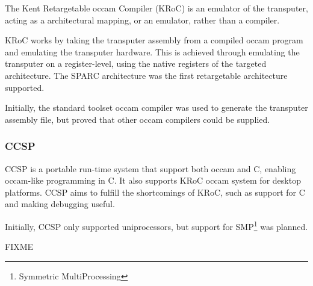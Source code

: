 The Kent Retargetable occam Compiler (KRoC) \citep{kroc} is an emulator of the transputer, acting as a architectural mapping, or an emulator, rather than a compiler.

KRoC works by taking the transputer assembly from a compiled occam program and emulating the transputer hardware. This is achieved through emulating the transputer on a register-level, using the native registers of the targeted architecture. The SPARC architecture was the first retargetable architecture supported. 

Initially, the standard toolset occam compiler was used to generate the transputer assembly file, but proved that other occam compilers could be supplied. 


\subsubsection{CCSP}
\label{sssec:ccsp}

CCSP \citep{ccsp} is a portable run-time system that support both occam and C, enabling occam-like programming in C. It also supports KRoC occam system for desktop platforms. CCSP aims to fulfill the shortcomings of KRoC, such as support for C and making debugging useful.

Initially, CCSP only supported uniprocessors, but support for SMP\footnote{Symmetric MultiProcessing} was planned. 

FIXME